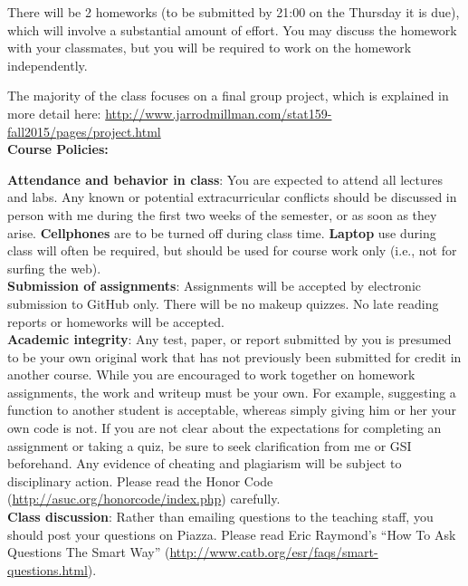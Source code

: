 \documentclass[11pt]{article}
\begin{document}
There will be 2 homeworks (to be submitted by 21:00 on the Thursday it is
due), which will involve a substantial amount of
effort.  You may discuss the homework with your classmates, but you will
be required to work on the homework independently.

The majority of the class focuses on a final group project, which is
explained in more detail here:
 \url{http://www.jarrodmillman.com/stat159-fall2015/pages/project.html}\\


\textbf{\large Course Policies:}

\textbf{Attendance and behavior in class}: You are expected to attend all lectures
and labs.  Any known or potential extracurricular conflicts should be discussed
in person with me during the first two weeks of the semester, or as
soon as they arise. \textbf{Cellphones} are to be turned off during class time.
\textbf{Laptop} use during class will often be required, but should be
used for course work only (i.e., not for surfing the web).\\

\textbf{Submission of assignments}: Assignments will be accepted by electronic
submission to GitHub only.  There will be no makeup quizzes. No
late reading reports or homeworks will be accepted. \\ %

\textbf{Academic integrity}: Any test, paper, or report submitted by you is presumed
to be your own original work that has not previously been submitted for credit
in another course. While you are encouraged to work together on homework
assignments, the work and writeup must be your own. For example, suggesting a
function to another student is acceptable, whereas simply giving him or her
your own code is not.  If you are not clear about the expectations for
completing an assignment or taking a quiz, be sure to seek clarification from
me or GSI beforehand. Any evidence of cheating and plagiarism will
be subject to disciplinary action.  Please read the Honor
Code (\url{http://asuc.org/honorcode/index.php}) carefully.\\

\textbf{Class discussion}: 
Rather than emailing questions to the teaching staff, you should post
your questions on Piazza. Please read Eric Raymond's ``How To Ask Questions
The Smart Way'' (\url{http://www.catb.org/esr/faqs/smart-questions.html}).
\end{document}
